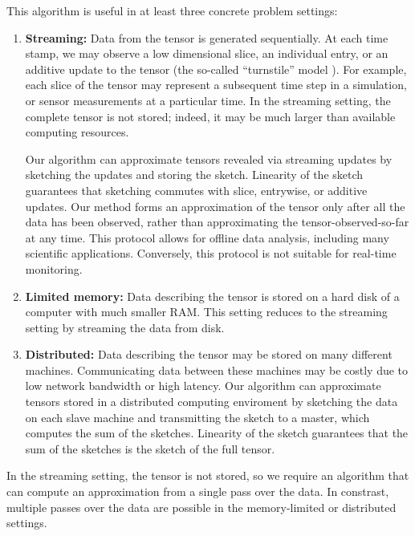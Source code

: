 This algorithm is useful in at least three concrete problem settings:
\begin{enumerate}
\item{\bf Streaming:} Data from the tensor is generated sequentially.
At each time stamp, we may observe
a low dimensional slice,
an individual entry,
or an additive update to the tensor
(the so-called ``turnstile'' model \cite{muthukrishnan2005data}).
For example, each slice of the tensor may represent a subsequent
time step in a simulation, or sensor measurements at a particular time.
In the streaming setting,
the complete tensor is not stored; indeed, it may be much larger than
available computing resources.

Our algorithm can approximate tensors revealed via streaming updates
by sketching the updates and storing the sketch.
Linearity of the sketch guarantees that sketching commutes with
slice, entrywise, or additive updates.
Our method forms an approximation of the tensor
only after all the data has been observed,
rather than approximating the tensor-observed-so-far at any time.
This protocol allows for offline data analysis,
including many scientific applications.
Conversely, this protocol is not suitable for real-time monitoring.

\item{\bf Limited memory:} Data describing the tensor is stored on a hard disk
of a computer with much smaller RAM.
This setting reduces to the streaming setting by streaming the data
from disk.
\item {\bf Distributed:} Data describing the tensor may
be stored on many different machines.
Communicating data between these machines may be costly due to low
network bandwidth or high latency.
Our algorithm can approximate tensors stored in a distributed computing enviroment
by sketching the data on each slave machine and transmitting the sketch to a master,
which computes the sum of the sketches.
Linearity of the sketch guarantees that
the sum of the sketches is the sketch of the full tensor.
\end{enumerate}
In the streaming setting, the tensor is not stored, so
we require an algorithm that can compute an approximation from a single pass over the data.
In constrast, multiple passes over the data are possible in
the memory-limited or distributed settings.





